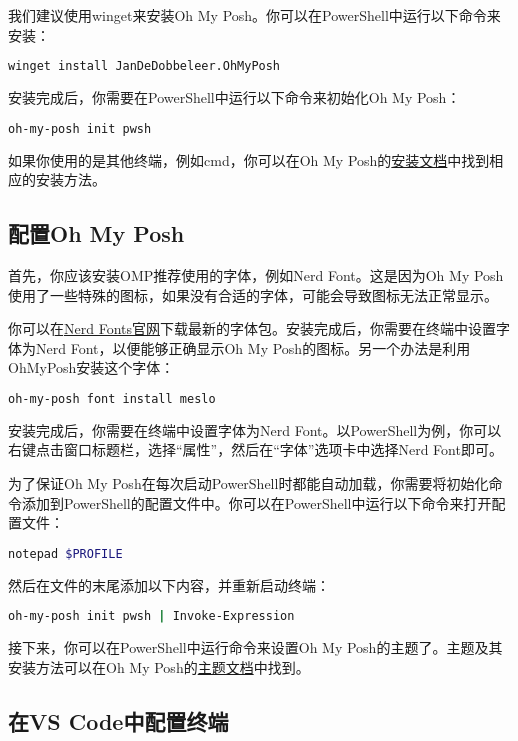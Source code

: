 \documentclass[../main.tex]{subfiles}
\begin{document}
我们建议使用winget来安装Oh My Posh。你可以在PowerShell中运行以下命令来安装：

\begin{lstlisting}[language=bash]
  winget install JanDeDobbeleer.OhMyPosh
\end{lstlisting}

安装完成后，你需要在PowerShell中运行以下命令来初始化Oh My Posh：
\begin{lstlisting}[language=bash]
  oh-my-posh init pwsh
\end{lstlisting}

如果你使用的是其他终端，例如cmd，你可以在Oh My Posh的\href{https://ohmyposh.dev/docs/installation}{安装文档}中找到相应的安装方法。

\subsection{配置Oh My Posh}

首先，你应该安装OMP推荐使用的字体，例如Nerd Font。这是因为Oh My Posh使用了一些特殊的图标，如果没有合适的字体，可能会导致图标无法正常显示。

你可以在\href{https://www.nerdfonts.com/}{Nerd Fonts官网}下载最新的字体包。安装完成后，你需要在终端中设置字体为Nerd Font，以便能够正确显示Oh My Posh的图标。另一个办法是利用OhMyPosh安装这个字体：
\begin{lstlisting}[language=bash]
  oh-my-posh font install meslo
\end{lstlisting}

安装完成后，你需要在终端中设置字体为Nerd Font。以PowerShell为例，你可以右键点击窗口标题栏，选择“属性”，然后在“字体”选项卡中选择Nerd Font即可。

为了保证Oh My Posh在每次启动PowerShell时都能自动加载，你需要将初始化命令添加到PowerShell的配置文件中。你可以在PowerShell中运行以下命令来打开配置文件：
\begin{lstlisting}[language=bash]
  notepad $PROFILE
\end{lstlisting}

然后在文件的末尾添加以下内容，并重新启动终端：
\begin{lstlisting}[language=bash]
  oh-my-posh init pwsh | Invoke-Expression
\end{lstlisting}

接下来，你可以在PowerShell中运行命令来设置Oh My Posh的主题了。主题及其安装方法可以在Oh My Posh的\href{https://ohmyposh.dev/docs/themes}{主题文档}中找到。

\subsection{在VS Code中配置终端}
\end{document}
